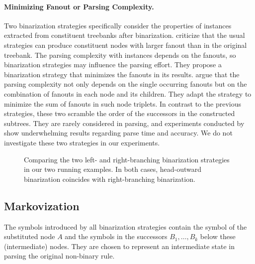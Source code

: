 \documentclass[../../document.tex]{subfiles}
\begin{document}
    \paragraph{Minimizing Fanout or Parsing Complexity.}
    Two binarization strategies specifically consider the properties of  instances extracted from constituent treebanks after binarization.
     criticize that the usual strategies can produce constituent nodes with larger fanout than in the original treebank.
    The parsing complexity with  instances depends on the fanouts, so binarization strategies may influence the parsing effort.
    They propose a binarization strategy that minimizes the fanouts in its results.
     argue that the parsing complexity not only depends on the single occurring fanouts but on the combination of fanouts in each node and its children.
    They adapt the strategy to minimize the sum of fanouts in such node triplets.
    In contrast to the previous strategies, these two scramble the order of the successors in the constructed subtrees.
    They are rarely considered in parsing, and experiments conducted by \citet{Cra12} show underwhelming results regarding parse time and accuracy.
    We do not investigate these two strategies in our experiments.

    \begin{figure}
        \resizebox{.3\linewidth}{!}{}\hfill
        \resizebox{.3\linewidth}{!}{}\hfill
        \resizebox{.3\linewidth}{!}{}

        \vspace{.5cm}

        \resizebox{.3\linewidth}{!}{}\hfill
        \resizebox{.3\linewidth}{!}{}\hfill
        \resizebox{.3\linewidth}{!}{}

        \caption{\label{fig:ex:binarization}
            Comparing the two left- and right-branching binarization strategies in our two running examples.
            In both cases, head-outward binarization coincides with right-branching binarization.
        }
    \end{figure}


    \subsection{Markovization}
    The symbols introduced by all binarization strategies contain the symbol of the substituted node \(A\) and the symbols in the successors \(B_1, \ldots, B_k\) below these (intermediate) nodes.
    They are chosen to represent an intermediate state in parsing the original non-binary rule.
\end{document}
